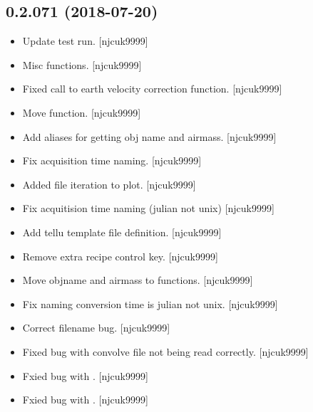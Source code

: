 \documentclass[a4paper,10pt,english]{report}
\begin{document}
\subsection{0.2.071 (2018-07-20)}
\label{\detokenize{misc/changelog:id387}}\begin{itemize}
\item {} 
Update test run. {[}njcuk9999{]}

\item {} 
Misc functions. {[}njcuk9999{]}

\item {} 
Fixed call to earth velocity correction function. {[}njcuk9999{]}

\item {} 
Move  function. {[}njcuk9999{]}

\item {} 
Add aliases for getting obj name and airmass. {[}njcuk9999{]}

\item {} 
Fix acquisition time naming. {[}njcuk9999{]}

\item {} 
Added file iteration to plot. {[}njcuk9999{]}

\item {} 
Fix acquitision time naming (julian not unix) {[}njcuk9999{]}

\item {} 
Add tellu template file definition. {[}njcuk9999{]}

\item {} 
Remove extra recipe control key. {[}njcuk9999{]}

\item {} 
Move objname and airmass to functions. {[}njcuk9999{]}

\item {} 
Fix naming conversion time is julian not unix. {[}njcuk9999{]}

\item {} 
Correct filename bug. {[}njcuk9999{]}

\item {} 
Fixed bug with convolve file not being read correctly. {[}njcuk9999{]}

\item {} 
Fxied bug with . {[}njcuk9999{]}

\item {} 
Fxied bug with . {[}njcuk9999{]}


\end{itemize}
\end{document}
